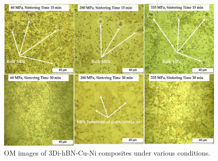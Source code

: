 \begin{figure}[!htb]
\centering
\includegraphics[width=\linewidth]{graphics/chapter_2/OM images}
\caption{OM images of 3Di-hBN-Cu-Ni composites under various conditions.}
\label{fig:OM_images}
\end{figure}
